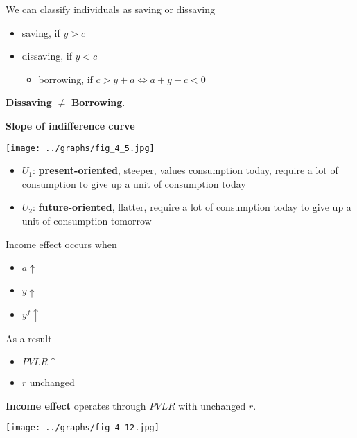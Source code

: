 \documentclass[letterpaper, 9pt,landscape]{extarticle}
\begin{document}
\begin{multicols*}{5}
\begin{remark}
    We can classify individuals as saving or dissaving
    \begin{itemize}
        \item saving, if $y > c$
        \item dissaving, if $y < c$
        \begin{itemize}
            \item borrowing, if $c > y + a \iff a + y - c < 0$
        \end{itemize} 
    \end{itemize} 

    \textbf{Dissaving} $\neq$ \textbf{Borrowing}.
\end{remark}


\begin{remark}
    \textbf{Slope of indifference curve}
\begin{center}
\texttt{[image: ../graphs/fig\_4\_5.jpg]}
\end{center}
    \begin{itemize}
        \item $U_1$: \textbf{present-oriented}, steeper, values consumption today, require a lot of consumption to give up a unit of consumption today
        \item $U_2$: \textbf{future-oriented}, flatter, require a lot of consumption today to give up a unit of consumption tomorrow
    \end{itemize} 
\end{remark}


\begin{remark}
    Income effect occurs when 
    \begin{itemize}
        \item $a \uparrow$
        \item $y \uparrow$
        \item $y^f \uparrow$
    \end{itemize} 
    As a result
    \begin{itemize}
        \item $PVLR \uparrow$
        \item $r$ unchanged
    \end{itemize} 

    \textbf{Income effect} operates through $PVLR$ with unchanged $r$.
\begin{center}
\texttt{[image: ../graphs/fig\_4\_12.jpg]}
\end{center}
\end{remark}


\end{multicols*}
\end{document}
